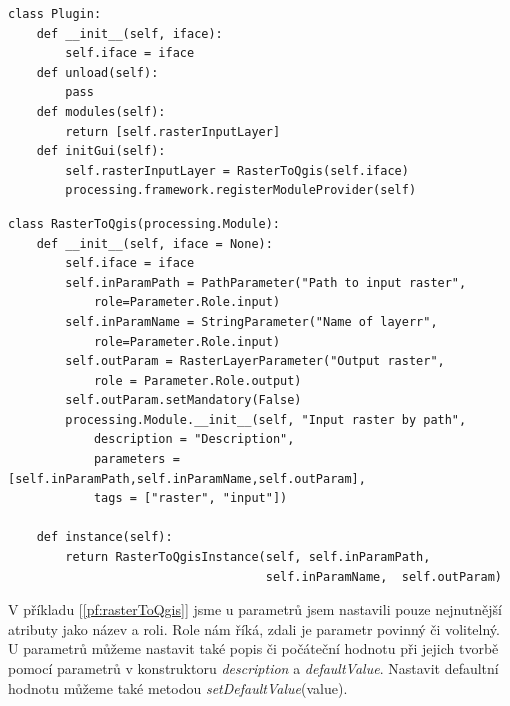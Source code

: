 \newpage
\begin{lstlisting}[caption={Třída Plugin pro QGIS Processing Framework}, label=pf:plugin, morekeywords={Plugin, __init__, modules, initGUI, unload}]
class Plugin:
    def __init__(self, iface):
        self.iface = iface
    def unload(self):
        pass
    def modules(self):
        return [self.rasterInputLayer]
    def initGui(self):
        self.rasterInputLayer = RasterToQgis(self.iface)
        processing.framework.registerModuleProvider(self)
\end{lstlisting}
\newpage
\begin{lstlisting}[caption={Třída RasterToQgis reprezentující modul pro QGIS Processing Framework}, label=pf:rasterToQgis, morekeywords={processing.Module,RasterToQgis, __init__, instance, RasterToQgisInstance, PathParameter, StringParameter, RasterLayerParameter}]
class RasterToQgis(processing.Module):
    def __init__(self, iface = None):
        self.iface = iface
        self.inParamPath = PathParameter("Path to input raster",
        	role=Parameter.Role.input)
        self.inParamName = StringParameter("Name of layerr",
        	role=Parameter.Role.input)
        self.outParam = RasterLayerParameter("Output raster",
        	role = Parameter.Role.output)
        self.outParam.setMandatory(False)
        processing.Module.__init__(self, "Input raster by path", 
            description = "Description",
            parameters = [self.inParamPath,self.inParamName,self.outParam], 
            tags = ["raster", "input"])

    def instance(self):
        return RasterToQgisInstance(self, self.inParamPath,
        							self.inParamName,  self.outParam)
\end{lstlisting}

V příkladu [\autoref{pf:rasterToQgis}] jsme u parametrů jsem nastavili
pouze nejnutnější atributy jako název a roli. Role nám říká, zdali je
parametr povinný či volitelný. U parametrů můžeme nastavit také popis
či počáteční hodnotu při jejich tvorbě pomocí parametrů v
konstruktoru \textit{description} a \textit{defaultValue}. Nastavit
defaultní hodnotu můžeme také
metodou \textit{setDefaultValue}(value). \\

